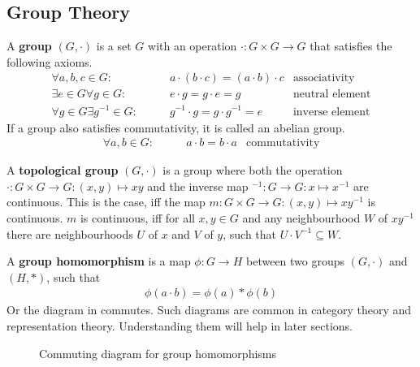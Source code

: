 \subsection{Group Theory}

A \textbf{group} $(G, \cdot)$ is a set $G$ with an operation $\cdot: G \times G \to G$ that satisfies the following axioms.
\begin{align}
    \forall a, b, c \in G: \qquad & a \cdot (b \cdot c) = (a \cdot b) \cdot c & \text{associativity} \\
    \exists e \in G \forall g \in G: \qquad & e \cdot g = g \cdot e = g & \text{neutral element} \\
    \forall g \in G \exists g^{-1} \in G: \qquad & g^{-1} \cdot g = g \cdot g^{-1} = e & \text{inverse element}
\end{align}
If a group also satisfies commutativity, it is called an abelian group.
\begin{align}
    \forall a, b \in G: \qquad & a \cdot b = b \cdot a & \text{commutativity}
\end{align}


A \textbf{topological group} $(G, \cdot)$ is a group where both the operation $\cdot: G \times G \to G: (x, y) \mapsto xy$ and the inverse map $^{-1}: G \to G: x \mapsto x^{-1}$ are continuous.
This is the case, iff the map $m: G \times G \to G: (x, y) \mapsto xy^{-1}$ is continuous.
$m$ is continuous, iff for all $x, y \in G$ and any neighbourhood $W$ of $xy^{-1}$ there are neighbourhoods $U$ of $x$ and $V$ of $y$, such that $U \cdot V^{-1} \subseteq W$.


A \textbf{group homomorphism} is a map $\phi: G \to H$ between two groups $(G, \cdot)$ and $(H, *)$, such that
\begin{align}
    \phi(a \cdot b) = \phi(a) * \phi(b)
\end{align}
Or the diagram in  commutes.
Such diagrams are common in category theory and representation theory.
Understanding them will help in later sections.
\begin{figure}[h]
    \centering
    \caption{Commuting diagram for group homomorphisms}
    \label{fig:fundamentals.groups.hom-cd}
\end{figure}

